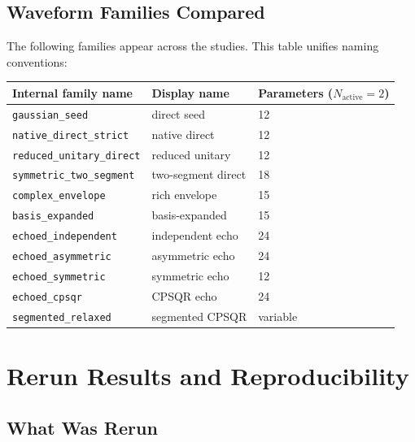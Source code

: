 \documentclass[11pt,letterpaper]{article}
\newcommand{\nact}{N_{\text{active}}}
\begin{document}
\subsection{Waveform Families Compared}

The following families appear across the studies.
This table unifies naming conventions:

\begin{center}
\begin{tabular}{lll}
\toprule
Internal family name & Display name & Parameters ($\nact = 2$) \\
\midrule
\texttt{gaussian\_seed} & direct seed & 12 \\
\texttt{native\_direct\_strict} & native direct & 12 \\
\texttt{reduced\_unitary\_direct} & reduced unitary & 12 \\
\texttt{symmetric\_two\_segment} & two-segment direct & 18 \\
\texttt{complex\_envelope} & rich envelope & 15 \\
\texttt{basis\_expanded} & basis-expanded & 15 \\
\texttt{echoed\_independent} & independent echo & 24 \\
\texttt{echoed\_asymmetric} & asymmetric echo & 24 \\
\texttt{echoed\_symmetric} & symmetric echo & 12 \\
\texttt{echoed\_cpsqr} & CPSQR echo & 24 \\
\texttt{segmented\_relaxed} & segmented CPSQR & variable \\
\bottomrule
\end{tabular}
\end{center}

\section{Rerun Results and Reproducibility}

\subsection{What Was Rerun}
\end{document}
